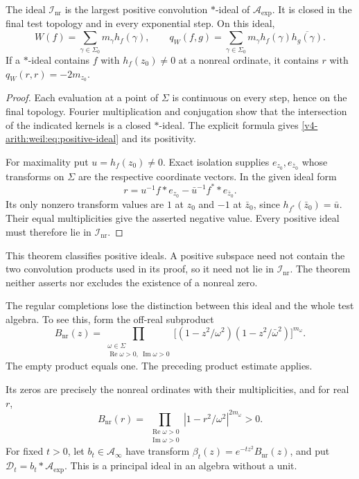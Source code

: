 \begin{theorem}
\label{v4-arith:weil:thm:maximal-ideal}
The ideal \(\mathcal I_{\mathrm{nr}}\) is the largest positive convolution
\(*\)-ideal of \(\mathscr A_{\exp}\). It is closed in the final test
topology and in every exponential step. On this ideal,
\begin{equation}
 W(f)=\sum_{\gamma\in\Sigma_0}m_\gamma h_f(\gamma),\qquad
 q_W(f,g)=\sum_{\gamma\in\Sigma_0}m_\gamma
                         h_f(\gamma)\overline{h_g(\gamma)}.
 \label{v4-arith:weil:eq:positive-ideal}
\end{equation}
If a \(*\)-ideal contains \(f\) with \(h_f(z_0)\ne0\) at a nonreal
ordinate, it contains \(r\) with \(q_W(r,r)=-2m_{z_0}\).
\end{theorem}
\begin{proof}
Each evaluation at a point of \(\Sigma\) is continuous on every step,
hence on the final topology. Fourier multiplication and conjugation
show that the intersection of the indicated kernels is a closed
\(*\)-ideal. The explicit formula gives
\eqref{v4-arith:weil:eq:positive-ideal} and its positivity.

For maximality put \(u=h_f(z_0)\ne0\). Exact isolation supplies
\(e_{z_0},e_{\bar z_0}\) whose transforms on \(\Sigma\) are the respective
coordinate vectors. In the given ideal form
\[
 r=u^{-1}f*e_{z_0}-\bar u^{-1}f^**e_{\bar z_0}.
\]
Its only nonzero transform values are \(1\) at \(z_0\) and \(-1\)
at \(\bar z_0\), since \(h_{f^*}(\bar z_0)=\bar u\).
Their equal multiplicities give the asserted negative value.
Every positive ideal must therefore lie in \(\mathcal I_{\mathrm{nr}}\).
\end{proof}

This theorem classifies positive ideals. A positive subspace need not
contain the two convolution products used in its proof, so it need not
lie in \(\mathcal I_{\mathrm{nr}}\). The theorem neither asserts nor
excludes the existence of a nonreal zero.

The regular completions lose the distinction between this ideal and the
whole test algebra. To see this, form the off-real subproduct
\[
 B_{\mathrm{nr}}(z)=
 \prod_{\substack{\omega\in\Sigma\\
          \operatorname{Re}\omega>0,\ \operatorname{Im}\omega>0}}
       \bigl[(1-z^2/\omega^2)(1-z^2/\bar\omega^2)\bigr]^{m_\omega}.
\]
The empty product equals one. The preceding product estimate applies.

Its zeros are precisely the nonreal ordinates with their multiplicities,
and for real \(r\),
\[
 B_{\mathrm{nr}}(r)=
 \prod_{\substack{\operatorname{Re}\omega>0\\
                   \operatorname{Im}\omega>0}}
              |1-r^2/\omega^2|^{2m_\omega}>0.
\]
For fixed \(t>0\), let \(b_t\in\mathscr A_\infty\) have transform
\(\beta_t(z)=e^{-tz^2}B_{\mathrm{nr}}(z)\), and put
\(\mathcal D_t=b_t*\mathscr A_{\exp}\).
This is a principal ideal in an algebra without a unit.

